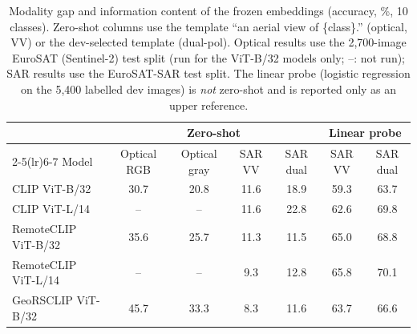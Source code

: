 \begin{table}[t]
\centering
\scriptsize
\caption{Modality gap and information content of the frozen embeddings (accuracy, \%, 10 classes). Zero-shot columns use the template ``an aerial view of \{class\}.'' (optical, VV) or the dev-selected template (dual-pol). Optical results use the 2,700-image EuroSAT (Sentinel-2) test split (run for the ViT-B/32 models only; --: not run); SAR results use the EuroSAT-SAR test split. The linear probe (logistic regression on the 5,400 labelled dev images) is \emph{not} zero-shot and is reported only as an upper reference.}
\label{tab:gap}
\begin{tabular*}{\hsize}{@{\extracolsep{\fill}}lcccccc@{}}
\toprule
& \multicolumn{4}{c}{Zero-shot} & \multicolumn{2}{c}{Linear probe} \\
\cmidrule(lr){2-5}\cmidrule(lr){6-7}
Model & Optical RGB & Optical gray & SAR VV & SAR dual & SAR VV & SAR dual \\
\midrule
CLIP ViT-B/32 & 30.7 & 20.8 & 11.6 & 18.9 & 59.3 & 63.7 \\
CLIP ViT-L/14 & -- & -- & 11.6 & 22.8 & 62.6 & 69.8 \\
RemoteCLIP ViT-B/32 & 35.6 & 25.7 & 11.3 & 11.5 & 65.0 & 68.8 \\
RemoteCLIP ViT-L/14 & -- & -- & 9.3 & 12.8 & 65.8 & 70.1 \\
GeoRSCLIP ViT-B/32 & 45.7 & 33.3 & 8.3 & 11.6 & 63.7 & 66.6 \\
\bottomrule
\end{tabular*}
\end{table}
